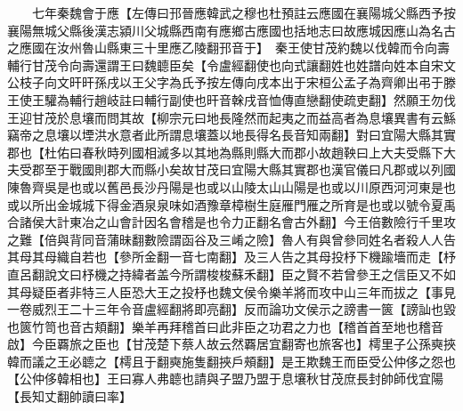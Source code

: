 　　七年秦魏會于應【左傳曰邘晉應韓武之穆也杜預註云應國在襄陽城父縣西予按襄陽無城父縣後漢志潁川父城縣西南有應鄉古應國也括地志曰故應城因應山為名古之應國在汝州魯山縣東三十里應乙陵翻邘音于】　秦王使甘茂約魏以伐韓而令向壽輔行甘茂令向壽還謂王曰魏聼臣矣【令盧經翻使也向式讓翻姓也姓譜向姓本自宋文公枝子向文旰旰孫戌以王父字為氏予按左傳向戌本出于宋桓公孟子為齊卿出弔于滕王使王驩為輔行趙岐註曰輔行副使也旰音榦戌音恤傳直戀翻使疏吏翻】然願王勿伐王迎甘茂於息壤而問其故【柳宗元曰地長隆然而起夷之而益高者為息壤異書有云鯀竊帝之息壤以堙洪水意者此所謂息壤蓋以地長得名長音知兩翻】對曰宜陽大縣其實郡也【杜佑曰春秋時列國相滅多以其地為縣則縣大而郡小故趙鞅曰上大夫受縣下大夫受郡至于戰國則郡大而縣小矣故甘茂曰宜陽大縣其實郡也漢官儀曰凡郡或以列國陳魯齊吳是也或以舊邑長沙丹陽是也或以山陵太山山陽是也或以川原西河河東是也或以所出金城城下得金酒泉泉味如酒豫章樟樹生庭雁門雁之所育是也或以號令夏禹合諸侯大計東冶之山會計因名會稽是也令力正翻名會古外翻】今王倍數險行千里攻之難【倍與背同音蒲昧翻數險謂函谷及三崤之險】魯人有與曾參同姓名者殺人人告其母其母織自若也【參所金翻一音七南翻】及三人告之其母投杼下機踰墻而走【杼直呂翻說文曰杼機之持緯者盖今所謂梭梭蘇禾翻】臣之賢不若曾參王之信臣又不如其母疑臣者非特三人臣恐大王之投杼也魏文侯令樂羊將而攻中山三年而拔之【事見一卷威烈王二十三年令音盧經翻將即亮翻】反而論功文侯示之謗書一篋【謗訕也毀也篋竹笥也音古頬翻】樂羊再拜稽首曰此非臣之功君之力也【稽首首至地也稽音啟】今臣覉旅之臣也【甘茂楚下蔡人故云然覉居宜翻寄也旅客也】樗里子公孫奭挾韓而議之王必聼之【樗且于翻奭施隻翻挾戶頰翻】是王欺魏王而臣受公仲侈之怨也【公仲侈韓相也】王曰寡人弗聼也請與子盟乃盟于息壤秋甘茂庶長封帥師伐宜陽【長知丈翻帥讀曰率】

